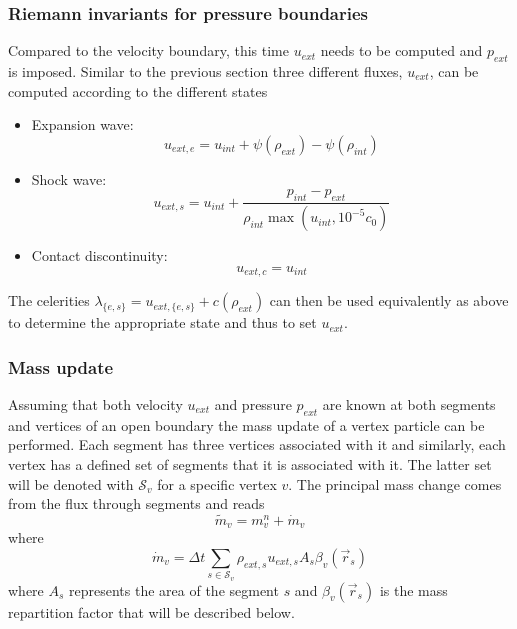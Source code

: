\subsubsection{Riemann invariants for pressure boundaries}
\label{h:open:pres}
Compared to the velocity boundary, this time $u_{ext}$ needs to be
computed and $p_{ext}$ is imposed. Similar to the previous section three
different fluxes, $u_{ext}$, can be computed according to the different
states
\begin{itemize}
\item Expansion wave:
\begin{equation}
u_{ext,e} = u_{int} + \psi(\rho_{ext}) - \psi(\rho_{int})
\label{e:open:pexp}
\end{equation}
\item Shock wave:
\begin{equation}
u_{ext,s} = u_{int} + \frac{p_{int} - p_{ext}}{\rho_{int}\max(u_{int},
10^{-5}c_0)}
\label{e:open:pshock}
\end{equation}
\item Contact discontinuity:
\begin{equation}
u_{ext,c} = u_{int}
\label{e:open:pcontact}
\end{equation}
\end{itemize}
The celerities $\lambda_{\{e,s\}} = u_{ext,\{e,s\}} + c(\rho_{ext})$ can
then be used equivalently as above to determine the appropriate state
and thus to set $u_{ext}$.

\subsubsection{Mass update}
Assuming that both velocity $u_{ext}$ and pressure $p_{ext}$ are known
at both segments and vertices of an open boundary the mass update of a
vertex particle can be performed. Each segment has three vertices
associated with it and similarly, each vertex has a defined set of
segments that it is associated with it. The latter set will be denoted
with $\mathcal{S}_v$ for a specific vertex $v$. The principal mass
change comes from the flux through segments and reads
\begin{equation}
\widetilde{m}_v = m^n_v + \dot{m}_v
\label{e:open:mtilde}
\end{equation}
where
\begin{equation}
\dot{m}_v = \Delta t \underset{s \in \mathcal{S}_v}{\sum}
\rho_{ext,s} u_{ext,s} A_s \beta_v(\vec{r}_s)
\label{e:open:mdot}
\end{equation}
where $A_s$ represents the area of the segment $s$ and
$\beta_v(\vec{r}_s)$ is the mass repartition factor that will be
described below.


